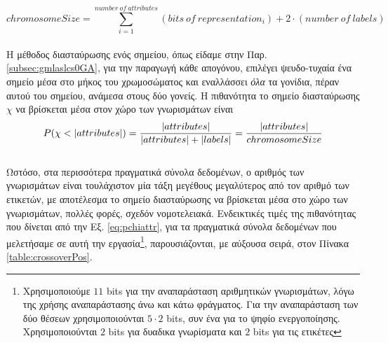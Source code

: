 \begin{equation}
chromosomeSize = \sum_{i=1}^{number \: of \: attributes} (bits \: of \: representation_{i}) + 2 \cdot (number \: of \: labels)
\end{equation}
\\
Η μέθοδος διασταύρωσης ενός σημείου, όπως είδαμε στην Παρ. \ref{subsec:gmlaslcs0GA}, για την παραγωγή κάθε απογόνου, επιλέγει ψευδο-τυχαία ένα σημείο μέσα στο μήκος του χρωμοσώματος και εναλλάσσει \emph{όλα} τα γονίδια, πέραν αυτού του σημείου, ανάμεσα στους δύο γονείς. Η πιθανότητα το σημείο διασταύρωσης $\chi$ να βρίσκεται μέσα στον χώρο των γνωρισμάτων είναι 
\begin{equation}
\label{eq:pchiattr}
P(\chi < \lvert attributes\rvert) = \dfrac{\lvert attributes\rvert}{\lvert attributes\rvert+\lvert labels\rvert} = \dfrac{\lvert attributes\rvert}{chromosomeSize} 
\end{equation}
\\
Ωστόσο, στα περισσότερα πραγματικά σύνολα δεδομένων, ο αριθμός των γνωρισμάτων είναι τουλάχιστον μία τάξη μεγέθους μεγαλύτερος από τον αριθμό των ετικετών, με αποτέλεσμα το σημείο διασταύρωσης να βρίσκεται μέσα στο χώρο των γνωρισμάτων, πολλές φορές, σχεδόν νομοτελειακά. Ενδεικτικές τιμές της πιθανότητας που δίνεται από την Εξ. \ref{eq:pchiattr}, για τα πραγματικά σύνολα δεδομένων που μελετήσαμε σε αυτή την εργασία\footnote{Xρησιμοποιούμε $11$ bits για την αναπαράσταση αριθμητικών γνωρισμάτων, λόγω της χρήσης αναπαράστασης άνω και κάτω φράγματος. Για την αναπαράσταση των δύο θέσεων χρησιμοποιούνται $5 \cdot 2$ bits, συν ένα για το ψηφίο ενεργοποίησης. Χρησιμοποιούνται $2$ bits για δυαδικα γνωρίσματα και $2$ bits για τις ετικέτες}, παρουσιάζονται, με αύξουσα σειρά, στον Πίνακα \ref{table:crossoverPos}. 

